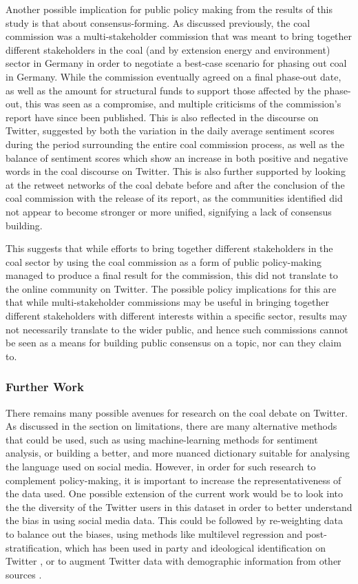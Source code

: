 \documentclass[12pt,onecolumn,twoside]{layout}
\begin{document}
Another possible implication for public policy making from the results of this study is that about consensus-forming. As discussed previously, the coal commission was a multi-stakeholder commission that was meant to bring together different stakeholders in the coal (and by extension energy and environment) sector in Germany in order to negotiate a best-case scenario for phasing out coal in Germany. While the commission eventually agreed on a final phase-out date, as well as the amount for structural funds to support those affected by the phase-out, this was seen as a compromise, and multiple criticisms of the commission's report have since been published. This is also reflected in the discourse on Twitter, suggested by both the variation in the daily average sentiment scores during the period surrounding the entire coal commission process, as well as the balance of sentiment scores which show an increase in both positive and negative words in the coal discourse on Twitter. This is also further supported by looking at the retweet networks of the coal debate before and after the conclusion of the coal commission with the release of its report, as the communities identified did not appear to become stronger or more unified, signifying a lack of consensus building.

This suggests that while efforts to bring together different stakeholders in the coal sector by using the coal commission as a form of public policy-making managed to produce a final result for the commission, this did not translate to the online community on Twitter. The possible policy implications for this are that while multi-stakeholder commissions may be useful in bringing together different stakeholders with different interests within a specific sector, results may not necessarily translate to the wider public, and hence such commissions cannot be seen as a means for building public consensus on a topic, nor can they claim to.

\subsubsection*{Further Work}
There remains many possible avenues for research on the coal debate on Twitter. As discussed in the section on limitations, there are many alternative methods that could be used, such as using machine-learning methods for sentiment analysis, or building a better, and more nuanced dictionary suitable for analysing the language used on social media. However, in order for such research to complement policy-making, it is important to increase the representativeness of the data used. One possible extension of the current work would be to look into the the diversity of the Twitter users in this dataset in order to better understand the bias in using social media data. This could be followed by re-weighting data to balance out the biases, using methods like multilevel regression and post-stratification, which has been used in party and ideological identification on Twitter \citep{Barbera2015}, or to augment Twitter data with demographic information from other sources \citep{Barbera2015a, Bode2016}.
\end{document}
